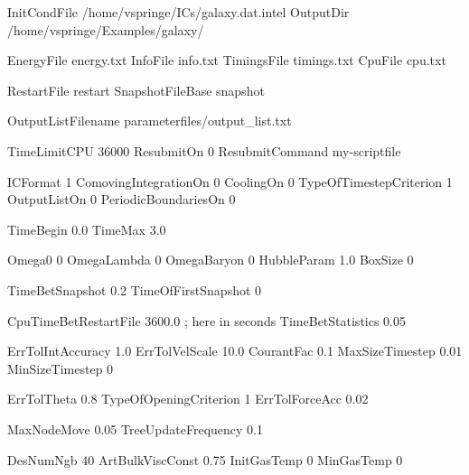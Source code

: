
InitCondFile      /home/vspringe/ICs/galaxy.dat.intel
OutputDir         /home/vspringe/Examples/galaxy/

EnergyFile        energy.txt
InfoFile          info.txt
TimingsFile       timings.txt
CpuFile           cpu.txt

RestartFile       restart
SnapshotFileBase  snapshot

OutputListFilename  parameterfiles/output_list.txt


TimeLimitCPU      36000  %
ResubmitOn        0
ResubmitCommand   my-scriptfile  




ICFormat                 1
ComovingIntegrationOn    0
CoolingOn                0
TypeOfTimestepCriterion  1
OutputListOn             0
PeriodicBoundariesOn     0


TimeBegin           0.0        %
TimeMax	            3.0        %

Omega0	              0
OmegaLambda           0
OmegaBaryon           0
HubbleParam         1.0
BoxSize               0


TimeBetSnapshot        0.2
TimeOfFirstSnapshot    0

CpuTimeBetRestartFile     3600.0    ; here in seconds
TimeBetStatistics         0.05




ErrTolIntAccuracy      1.0      %
ErrTolVelScale         10.0     %
CourantFac             0.1      %
MaxSizeTimestep        0.01 
MinSizeTimestep        0





ErrTolTheta            0.8            
TypeOfOpeningCriterion 1
ErrTolForceAcc         0.02

MaxNodeMove            0.05
TreeUpdateFrequency    0.1




DesNumNgb              40
ArtBulkViscConst       0.75
InitGasTemp            0          %
MinGasTemp             0    




